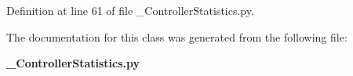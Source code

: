 \subsubsection[{variance\-\_\-time}]{}\label{classcontroller__manager__msgs_1_1msg_1_1__ControllerStatistics_1_1ControllerStatistics_a62dd9ad92b9de403ae9d89f49e5b3e26}


\-Definition at line 61 of file \-\_\-\-Controller\-Statistics.\-py.



\-The documentation for this class was generated from the following file\-:\begin{DoxyCompactItemize}
\item 
{\bf \-\_\-\-Controller\-Statistics.\-py}\end{DoxyCompactItemize}
